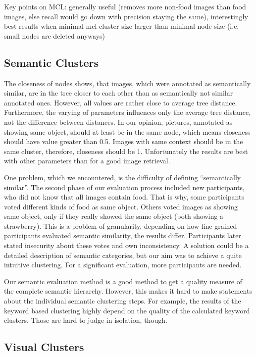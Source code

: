 \bigskip
Key points on MCL: generally useful (removes more non-food images than food images, else recall would go down with precision staying the same), interestingly best results when minimal mcl cluster size larger than minimal node size (i.e. small nodes are deleted anyways)

\subsection{Semantic Clusters}	
The closeness of nodes shows, that images, which were annotated as semantically similar, are in the tree closer to each other than as semantically not similar annotated ones. However, all values are rather close to average tree distance. Furthermore, the varying of parameters influences only the average tree distance, not the difference between distances. In our opinion, pictures, annotated as showing same object, should at least be in the same node, which means closeness should have value greater than 0.5. Images with same context should be in the same cluster, therefore, closeness should be 1. Unfortunately the results are best with other parameters than for a good image retrieval.

\bigskip
One problem, which we encountered, is the difficulty of defining ``semantically similar''. The second phase of our evaluation process included new participants, who did not know that all images contain food. That is why, some participants voted different kinds of food as same object. Others voted images as showing same object, only if they really showed the same object (both showing a strawberry). This is a problem of granularity, depending on how fine grained participants evaluated semantic similarity, the results differ. Participants later stated insecurity about these votes and own inconsistency. A solution could be a detailed description of semantic categories, but our aim was to achieve a quite intuitive clustering. For a significant evaluation, more participants are needed. 

\bigskip
Our semantic evaluation method is a good method to get a quality measure of the complete semantic hierarchy. However, this makes it hard to make statements about the individual semantic clustering steps. For example, the results of the keyword based clustering highly depend on the quality of the calculated keyword clusters. Those are hard to judge in isolation, though.\\	

\subsection{Visual Clusters}

